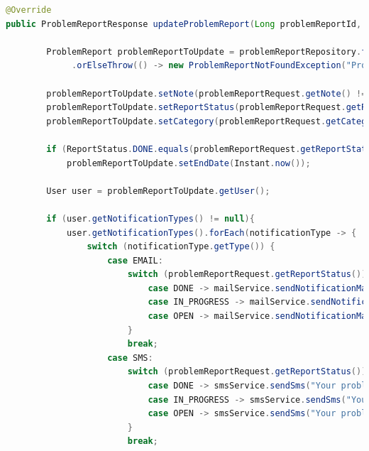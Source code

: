\begin{lstlisting}[language=Java, style=JavaStyle, caption=Aktualizacja zgłoszenia problemu.]
@Override
public ProblemReportResponse updateProblemReport(Long problemReportId, ProblemReportRequest problemReportRequest) throws ProblemReportNotFoundException {

        ProblemReport problemReportToUpdate = problemReportRepository.findById(problemReportId)
             .orElseThrow(() -> new ProblemReportNotFoundException("Problem report not found with id: " + problemReportId));

        problemReportToUpdate.setNote(problemReportRequest.getNote() != null ? problemReportRequest.getNote() : problemReportToUpdate.getNote());
        problemReportToUpdate.setReportStatus(problemReportRequest.getReportStatus() != null ? problemReportRequest.getReportStatus() : problemReportToUpdate.getReportStatus());
        problemReportToUpdate.setCategory(problemReportRequest.getCategory() != null ? problemReportRequest.getCategory() : problemReportToUpdate.getCategory());

        if (ReportStatus.DONE.equals(problemReportRequest.getReportStatus()))
            problemReportToUpdate.setEndDate(Instant.now());

        User user = problemReportToUpdate.getUser();

        if (user.getNotificationTypes() != null){
            user.getNotificationTypes().forEach(notificationType -> {
                switch (notificationType.getType()) {
                    case EMAIL:
                        switch (problemReportRequest.getReportStatus()) {
                            case DONE -> mailService.sendNotificationMail("Problem report done", "Your problem report has been done", user.getEmail());
                            case IN_PROGRESS -> mailService.sendNotificationMail("Problem report in progress", "Your problem report is in progress", user.getEmail());
                            case OPEN -> mailService.sendNotificationMail("Problem report open", "Your problem report is open", user.getEmail());
                        }
                        break;
                    case SMS:
                        switch (problemReportRequest.getReportStatus()) {
                            case DONE -> smsService.sendSms("Your problem report has been done", user.getPhoneNumber());
                            case IN_PROGRESS -> smsService.sendSms("Your problem report is in progress", user.getPhoneNumber());
                            case OPEN -> smsService.sendSms("Your problem report is open", user.getPhoneNumber());
                        }
                        break;


\end{lstlisting}
